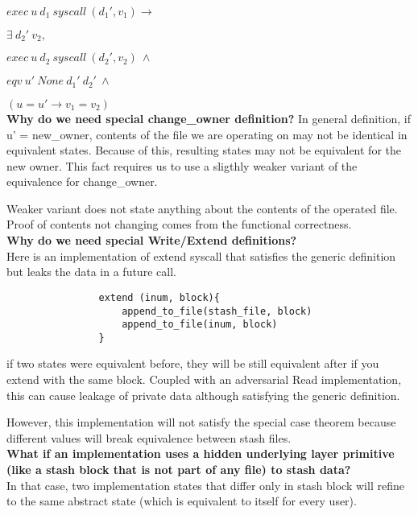 \documentclass[onecolumn]{paper}
\begin{document}
			$exec\ u\ d_1\ syscall\ (d_1', v_1) \rightarrow$
			
			$\exists\ d_2'\ v_2,$
			
			$exec\ u\ d_2\ syscall\ (d_2', v_2)\ \wedge$
			
			$eqv\ u'\ None\ d_1'\ d_2'\ \wedge$
			
			$(u = u' \rightarrow v_1 = v_2)$\\
			
			{\bf Why do we need special change\_owner definition?}
			In general definition, if u' = new\_owner, contents of the file we are operating on may not be identical in equivalent states. 
			Because of this, resulting states may not be equivalent for the new owner. 
			This fact requires us to use a sligthly weaker variant of the equivalence for change\_owner.
			
			Weaker variant does not state anything about the contents of the operated file.
			Proof of contents not changing comes from the functional correctness.\\
			
			
			{\bf Why do we need special Write/Extend definitions?}\\
			Here is an implementation of extend syscall that satisfies the generic definition but leaks the data in a future call.
			
			\begin{verbatim}
				extend (inum, block){
					append_to_file(stash_file, block)
					append_to_file(inum, block)
				}
			\end{verbatim}
			
			
			if two states were equivalent before, they will be still equivalent after if  you extend with the same block. Coupled with an adversarial Read implementation, this can cause leakage of private data although satisfying the generic definition.
			
			However, this implementation will not satisfy the special case theorem because different values will break equivalence between stash files.\\
			
			{\bf What if an implementation uses a hidden underlying layer primitive (like a stash block that is not part of any file) to stash data?}\\
			
			In that case, two implementation states that differ only in stash block will refine to the same abstract state (which is equivalent to itself for every user). 
			
\end{document}
